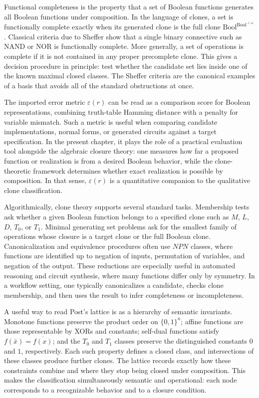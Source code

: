 Functional completeness is the property that a set of Boolean functions generates all Boolean functions under composition. In the language of clones, a set is functionally complete exactly when its generated clone is the full clone \(\mathrm{Bool}^{\mathrm{Bool}^{<\omega}}\). Classical criteria due to Sheffer show that a single binary connective such as NAND or NOR is functionally complete. More generally, a set of operations is complete if it is not contained in any proper precomplete clone. This gives a decision procedure in principle: test whether the candidate set lies inside one of the known maximal closed classes. The Sheffer criteria are the canonical examples of a basis that avoids all of the standard obstructions at once.

The imported error metric \(\varepsilon(r)\) can be read as a comparison score for Boolean representations, combining truth-table Hamming distance with a penalty for variable mismatch. Such a metric is useful when comparing candidate implementations, normal forms, or generated circuits against a target specification. In the present chapter, it plays the role of a practical evaluation tool alongside the algebraic closure theory: one measures how far a proposed function or realization is from a desired Boolean behavior, while the clone-theoretic framework determines whether exact realization is possible by composition. In that sense, \(\varepsilon(r)\) is a quantitative companion to the qualitative clone classification.

Algorithmically, clone theory supports several standard tasks. Membership tests ask whether a given Boolean function belongs to a specified clone such as \(M\), \(L\), \(D\), \(T_0\), or \(T_1\). Minimal generating set problems ask for the smallest family of operations whose closure is a target clone or the full Boolean clone. Canonicalization and equivalence procedures often use \(NPN\) classes, where functions are identified up to negation of inputs, permutation of variables, and negation of the output. These reductions are especially useful in automated reasoning and circuit synthesis, where many functions differ only by symmetry. In a workflow setting, one typically canonicalizes a candidate, checks clone membership, and then uses the result to infer completeness or incompleteness.

A useful way to read Post's lattice is as a hierarchy of semantic invariants. Monotone functions preserve the product order on \(\{0,1\}^n\); affine functions are those representable by XORs and constants; self-dual functions satisfy \(f(\bar{x})=\overline{f(x)}\); and the \(T_0\) and \(T_1\) classes preserve the distinguished constants \(0\) and \(1\), respectively. Each such property defines a closed class, and intersections of these classes produce further clones. The lattice records exactly how these constraints combine and where they stop being closed under composition. This makes the classification simultaneously semantic and operational: each node corresponds to a recognizable behavior and to a closure condition.

